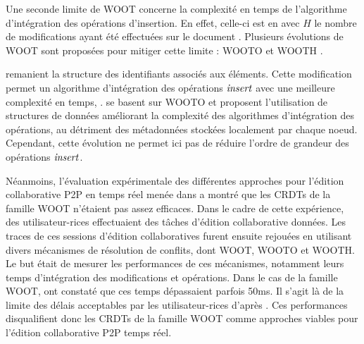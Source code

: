 Une seconde limite de WOOT concerne la complexité en temps de l'algorithme d'intégration des opérations d'insertion.
En effet, celle-ci est en  avec $H$ le nombre de modifications ayant été effectuées sur le document \cite{2011-evaluation-crdts-ahmed-nacer}.
Plusieurs évolutions de WOOT sont proposées pour mitiger cette limite : WOOTO \cite{2007-wooto-weiss} et WOOTH \cite{2011-evaluation-crdts-ahmed-nacer}.

\textcite{2007-wooto-weiss} remanient la structure des identifiants associés aux éléments.
Cette modification permet un algorithme d'intégration des opérations $\mathit{insert}$ avec une meilleure complexité en temps, .
\textcite{2011-evaluation-crdts-ahmed-nacer} se basent sur WOOTO et proposent l'utilisation de structures de données améliorant la complexité des algorithmes d'intégration des opérations, au détriment des métadonnées stockées localement par chaque noeud.
Cependant, cette évolution ne permet ici pas de réduire l'ordre de grandeur des opérations $\mathit{insert}$.

Néanmoins, l'évaluation expérimentale des différentes approches pour l'édition collaborative \ac{P2P} en temps réel menée dans \cite{2011-evaluation-crdts-ahmed-nacer} a montré que les \acp{CRDT} de la famille WOOT n'étaient pas assez efficaces.
Dans le cadre de cette expérience, des utilisateur-rices effectuaient des tâches d'édition collaborative données.
Les traces de ces sessions d'édition collaboratives furent ensuite rejouées en utilisant divers mécanismes de résolution de conflits, dont WOOT, WOOTO et WOOTH.
Le but était de mesurer les performances de ces mécanismes, notamment leurs temps d'intégration des modifications et opérations.
Dans le cas de la famille WOOT, \citeauthor{2011-evaluation-crdts-ahmed-nacer} ont constaté que ces temps dépassaient parfois 50ms.
Il s'agit là de la limite des délais acceptables par les utilisateur-rices d'après \cite{1984-human-performance-with-computers-shneiderman,2007-modeling-effects-delayed-feedback-jay}.
Ces performances disqualifient donc les \acp{CRDT} de la famille WOOT comme approches viables pour l'édition collaborative \ac{P2P} temps réel.
